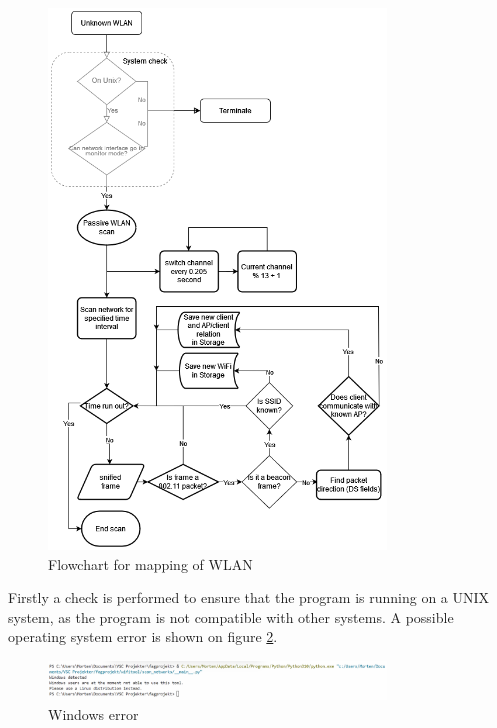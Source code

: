 \begin{figure}[H]
    \centering
    \includegraphics[width=0.8\textwidth]{Latex-Files/Billeder/Flowcharts/network_flowchart.png}
    \caption{Flowchart for mapping of WLAN}
    \label{Flowchart}
\end{figure}

\newpage

Firstly a check is performed to ensure that the program is running on a UNIX system, as the program is not compatible with other systems. A possible operating system error is shown on figure \ref{W_error}.

\begin{figure}[!htbp]
    \centering
    \includegraphics[width=0.8\textwidth]{Latex-Files/Billeder/Implementation/Windows_error.png}
    \caption{Windows error}
    \label{W_error}
\end{figure}

